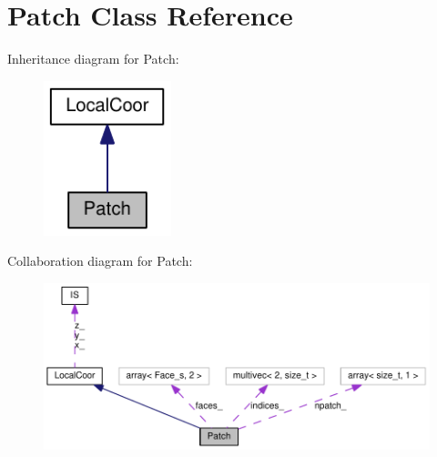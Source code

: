 \hypertarget{classPatch}{
\section{Patch Class Reference}
\label{classPatch}
}
Inheritance diagram for Patch:\nopagebreak
\begin{figure}[H]
\begin{center}
\leavevmode
\includegraphics[width=105pt]{classPatch__inherit__graph}
\end{center}
\end{figure}
Collaboration diagram for Patch:\nopagebreak
\begin{figure}[H]
\begin{center}
\leavevmode
\includegraphics[width=400pt]{classPatch__coll__graph}
\end{center}
\end{figure}
